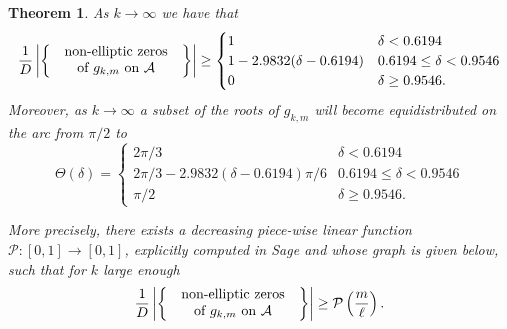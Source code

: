 \documentclass[12pt]{amsart}
\theoremstyle{plain} %
\newtheorem{theorem}    {Theorem}
\theoremstyle{definition}
\theoremstyle{remark}
\numberwithin{equation}{section}
\begin{document}
\begin{theorem}\label{t:main-arc}
As $k\to \infty$ we have that
\[\frac{1}{D}
\left|
\left\{
\parbox{3.3cm}{
\centering
non-elliptic zeros\\
of $g_{k,m}$ on $\mathcal{A}$
}
\right\}
\right|\geq \begin{cases}1&\delta<0.6194\\ 1-2.9832(\delta-0.6194)& 0.6194\leq \delta<0.9546\\ 0&\delta\geq 0.9546.\end{cases}\]
Moreover, as $k\to \infty$ a subset of the roots of $g_{k,m}$ will become equidistributed on the arc from $\pi/2$ to 
\[\Theta(\delta)=
	\begin{cases}
		2\pi/3 &\delta<0.6194\\
  		2\pi/3- 2.9832(\delta-0.6194)\pi / 6 & 0.6194\leq \delta<0.9546\\
  		\pi/ 2 &\delta\geq 0.9546.
\end{cases}\]

More precisely, there exists a decreasing piece-wise linear function
$\mathcal{P}:[0,1]\to [0,1]$, explicitly computed in Sage
and whose graph is given below, such that for $k$ large enough
\[\frac{1}{D}
\left|
\left\{
\parbox{3.3cm}{
\centering
non-elliptic zeros\\
of $g_{k,m}$ on $\mathcal{A}$
}
\right\}
\right|
\geq
\mathcal{P}\left(\frac{m}{\ell}\right).\]
\end{theorem}
\end{document}
